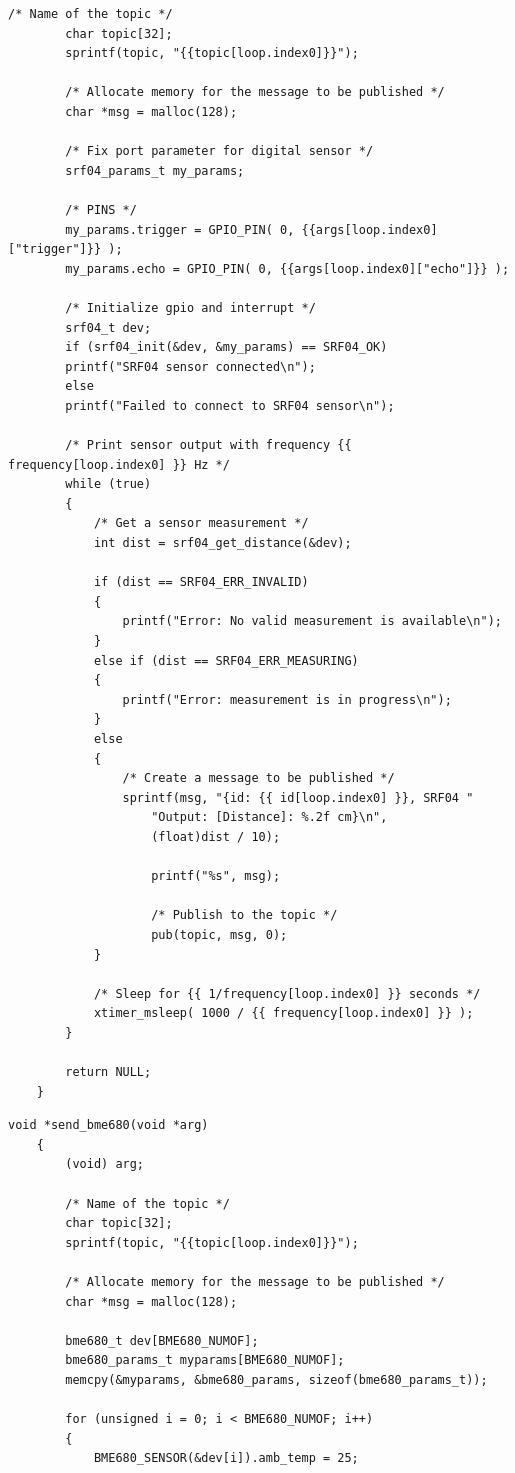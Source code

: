 \begin{appendices}
\begin{lstlisting}[style=CStyle, title={Πρότυπο παραγωγής κώδικα για αισθητήρα BME680}]
		/* Name of the topic */
		char topic[32];
		sprintf(topic, "{{topic[loop.index0]}}");
		
		/* Allocate memory for the message to be published */
		char *msg = malloc(128);
		
		/* Fix port parameter for digital sensor */
		srf04_params_t my_params;
		
		/* PINS */
		my_params.trigger = GPIO_PIN( 0, {{args[loop.index0]["trigger"]}} );
		my_params.echo = GPIO_PIN( 0, {{args[loop.index0]["echo"]}} );
		
		/* Initialize gpio and interrupt */
		srf04_t dev;
		if (srf04_init(&dev, &my_params) == SRF04_OK)
		printf("SRF04 sensor connected\n");
		else
		printf("Failed to connect to SRF04 sensor\n");
		
		/* Print sensor output with frequency {{ frequency[loop.index0] }} Hz */
		while (true)
		{
			/* Get a sensor measurement */
			int dist = srf04_get_distance(&dev);
			
			if (dist == SRF04_ERR_INVALID) 
			{
				printf("Error: No valid measurement is available\n");
			}
			else if (dist == SRF04_ERR_MEASURING) 
			{
				printf("Error: measurement is in progress\n");
			}
			else
			{
				/* Create a message to be published */
				sprintf(msg, "{id: {{ id[loop.index0] }}, SRF04 "
					"Output: [Distance]: %.2f cm}\n", 
					(float)dist / 10);
					
					printf("%s", msg);
					
					/* Publish to the topic */
					pub(topic, msg, 0);
			}
				
			/* Sleep for {{ 1/frequency[loop.index0] }} seconds */
			xtimer_msleep( 1000 / {{ frequency[loop.index0] }} );
		}
		
		return NULL;
	}
\end{lstlisting}

\newpage

\begin{lstlisting}[style=CStyle, title={Πρότυπο παραγωγής κώδικα για αισθητήρα BME680}]
	void *send_bme680(void *arg)
	{
		(void) arg;
		
		/* Name of the topic */
		char topic[32];
		sprintf(topic, "{{topic[loop.index0]}}");
		
		/* Allocate memory for the message to be published */
		char *msg = malloc(128);
		
		bme680_t dev[BME680_NUMOF];
		bme680_params_t myparams[BME680_NUMOF];
		memcpy(&myparams, &bme680_params, sizeof(bme680_params_t));
		
		for (unsigned i = 0; i < BME680_NUMOF; i++) 
		{
			BME680_SENSOR(&dev[i]).amb_temp = 25;
			

\end{lstlisting}
\end{appendices}
